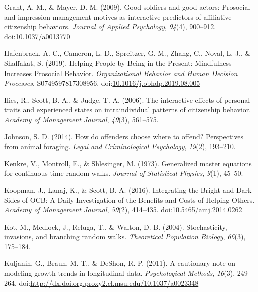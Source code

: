 \documentclass[english,,man]{apa6}
\theoremstyle{definition}
\theoremstyle{definition}
\theoremstyle{definition}
\theoremstyle{remark}
\begin{document}
\leavevmode\hypertarget{ref-grant_good_2009}{}%
Grant, A. M., \& Mayer, D. M. (2009). Good soldiers and good actors:
Prosocial and impression management motives as interactive predictors of
affiliative citizenship behaviors. \emph{Journal of Applied Psychology},
\emph{94}(4), 900--912.
doi:\href{https://doi.org/10.1037/a0013770}{10.1037/a0013770}

\leavevmode\hypertarget{ref-hafenbrack_helping_2019}{}%
Hafenbrack, A. C., Cameron, L. D., Spreitzer, G. M., Zhang, C., Noval,
L. J., \& Shaffakat, S. (2019). Helping People by Being in the Present:
Mindfulness Increases Prosocial Behavior. \emph{Organizational Behavior
and Human Decision Processes}, S0749597817308956.
doi:\href{https://doi.org/10.1016/j.obhdp.2019.08.005}{10.1016/j.obhdp.2019.08.005}

\leavevmode\hypertarget{ref-ilies_interactive_2006}{}%
Ilies, R., Scott, B. A., \& Judge, T. A. (2006). The interactive effects
of personal traits and experienced states on intraindividual patterns of
citizenship behavior. \emph{Academy of Management Journal},
\emph{49}(3), 561--575.

\leavevmode\hypertarget{ref-johnson2014offenders}{}%
Johnson, S. D. (2014). How do offenders choose where to offend?
Perspectives from animal foraging. \emph{Legal and Criminological
Psychology}, \emph{19}(2), 193--210.

\leavevmode\hypertarget{ref-kenkre1973generalized}{}%
Kenkre, V., Montroll, E., \& Shlesinger, M. (1973). Generalized master
equations for continuous-time random walks. \emph{Journal of Statistical
Physics}, \emph{9}(1), 45--50.

\leavevmode\hypertarget{ref-koopman_integrating_2016}{}%
Koopman, J., Lanaj, K., \& Scott, B. A. (2016). Integrating the Bright
and Dark Sides of OCB: A Daily Investigation of the Benefits and Costs
of Helping Others. \emph{Academy of Management Journal}, \emph{59}(2),
414--435.
doi:\href{https://doi.org/10.5465/amj.2014.0262}{10.5465/amj.2014.0262}

\leavevmode\hypertarget{ref-kot2004stochasticity}{}%
Kot, M., Medlock, J., Reluga, T., \& Walton, D. B. (2004).
Stochasticity, invasions, and branching random walks. \emph{Theoretical
Population Biology}, \emph{66}(3), 175--184.

\leavevmode\hypertarget{ref-kuljanin_cautionary_2011}{}%
Kuljanin, G., Braun, M. T., \& DeShon, R. P. (2011). A cautionary note
on modeling growth trends in longitudinal data. \emph{Psychological
Methods}, \emph{16}(3), 249--264.
doi:\href{https://doi.org/http://dx.doi.org.proxy2.cl.msu.edu/10.1037/a0023348}{http://dx.doi.org.proxy2.cl.msu.edu/10.1037/a0023348}
\end{document}
